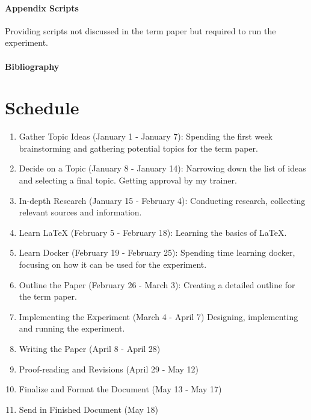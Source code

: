 \documentclass[12pt,letterpaper]{article} %
\begin{document}
\paragraph{Appendix Scripts}
Providing scripts not discussed in the term paper
but required to run the experiment.

\paragraph{Bibliography}

\section{Schedule}

\begin{enumerate}
    \item Gather Topic Ideas (January 1 - January 7):
    Spending the first week brainstorming and gathering potential topics for the term paper.
    \item Decide on a Topic (January 8 - January 14):
    Narrowing down the list of ideas and selecting a final topic.
    Getting approval by my trainer.
    \item In-depth Research (January 15 - February 4):
    Conducting research, collecting relevant sources and information.
    \item Learn LaTeX (February 5 - February 18):
    Learning the basics of LaTeX.
    \item Learn Docker (February 19 - February 25):
    Spending time learning docker, focusing on how it can be used for the experiment.
    \item Outline the Paper (February 26 - March 3):
    Creating a detailed outline for the term paper.
    \item Implementing the Experiment (March 4 - April 7)
    Designing, implementing and running the experiment.
    \item Writing the Paper (April 8 - April 28)
    \item Proof-reading and Revisions (April 29 - May 12)
    \item Finalize and Format the Document (May 13 - May 17)
    \item Send in Finished Document (May 18)
\end{enumerate}

\clearpage

\pagestyle{fancy}



\nocite{*} %
\end{document}
